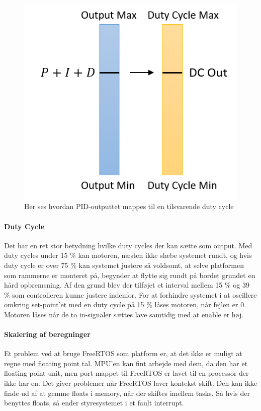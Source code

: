 \begin{figure}
	\begin{center}
	\includegraphics[scale=0.8]{Billeder/Mapping.png}
	\end{center}		
	\caption{Her ses hvordan PID-outputtet mappes til en tilsvarende duty cycle}
	\label{fig:Mapping}	
\end{figure}
\paragraph{Duty Cycle}

Det har en ret stor betydning hvilke duty cycles der kan sætte som output. Med duty cycles under 15 $\%$ kan motoren, næsten ikke slæbe systemet rundt, og hvis duty cycle er over 75 $\%$ kan systemet justere så voldsomt, at selve platformen som rammerne er monteret på, begynder at flytte sig rundt på bordet grundet en hård opbremsning. Af den grund blev der tilføjet et interval mellem 15 $\%$ og 39 $\%$ som controlleren kunne justere indenfor. For at forhindre systemet i at oscillere omkring set-point'et med en duty cycle på 15 $\%$ låses motoren, når fejlen er 0. Motoren låses når de to in-signaler sættes lave samtidig med at enable er høj.

\paragraph{Skalering af beregninger}

Et problem ved at bruge FreeRTOS som platform er, at det ikke er muligt at regne med floating point tal. MPU'en kan fint arbejde med dem, da den har et floating point unit, men port mappet til FreeRTOS er lavet til en processor der ikke har en. Det giver problemer når FreeRTOS laver kontekst skift. Den kan ikke finde ud af at gemme floats i memory, når der skiftes imellem tasks. Så hvis der benyttes floats, så ender styresystemet i et fault interrupt.

